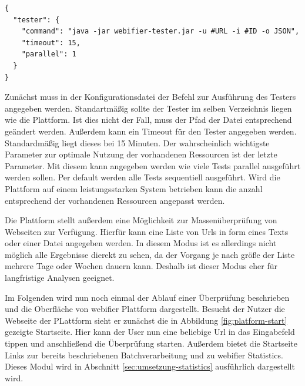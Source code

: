 \begin{scriptsize}
\begin{lstlisting}
{
  "tester": {
    "command": "java -jar webifier-tester.jar -u #URL -i #ID -o JSON",
    "timeout": 15,
    "parallel": 1
  }
}
\end{lstlisting}
\end{scriptsize}

Zunächst muss in der Konfigurationsdatei der Befehl zur Ausführung des Testers angegeben werden. Standartmäßig sollte der Tester im selben Verzeichnis liegen wie die Plattform. Ist dies nicht der Fall, muss der Pfad der Datei entsprechend geändert werden. Außerdem kann ein Timeout für den Tester angegeben werden. Standardmäßig liegt dieses bei 15 Minuten. Der wahrscheinlich wichtigste Parameter zur optimale Nutzung der vorhandenen Ressourcen ist der letzte Parameter. Mit diesem kann angegeben werden wie viele Tests parallel ausgeführt werden sollen. Per default werden alle Tests sequentiell ausgeführt. Wird die Plattform auf einem leistungsstarken System betrieben kann die anzahl entsprechend der vorhandenen Ressourcen angepasst werden.

Die Plattform stellt außerdem eine Möglichkeit zur Massenüberprüfung von Webseiten zur Verfügung. Hierfür kann eine Liste von Urls in form eines Texts oder einer Datei angegeben werden. In diesem Modus ist es allerdings nicht möglich alle Ergebnisse dierekt zu sehen, da der Vorgang je nach größe der Liste mehrere Tage oder Wochen dauern kann. Deshalb ist dieser Modus eher für langfristige Analysen geeignet.

Im Folgenden wird nun noch einmal der Ablauf einer Überprüfung beschrieben und die Oberfläche von webifier Plattform dargestellt. Besucht der Nutzer die Webseite der PLattform sieht er zunächst die in Abbildung \ref{fig:platform-start} gezeigte Startseite. Hier kann der User nun eine beliebige Url in das Eingabefeld tippen und anschließend die Überprüfung starten. Außerdem bietet die Startseite Links zur bereits beschriebenen Batchverarbeitung und zu webifier Statistics. Dieses Modul wird in Abschnitt \ref{sec:umsetzung-statistics} ausführlich dargestellt wird.

